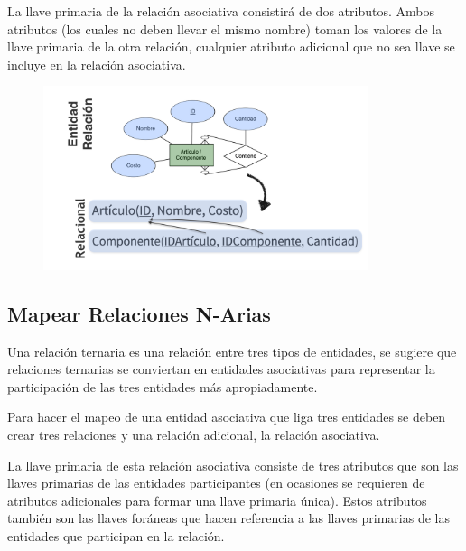 \documentclass[12pt, fleqn]{report}                             %
\theoremstyle{break}                                            %
\begin{document}
                La llave primaria de la relación asociativa consistirá de dos atributos.
                Ambos atributos (los cuales no deben llevar el mismo nombre) toman los valores de la llave
                primaria de la otra relación, cualquier atributo adicional que no sea llave se incluye en la
                relación asociativa.

                \begin{figure}[h]
                    \centering
                    \includegraphics[width=0.85\textwidth]{MapeoRelacionesUnariasMuchosMuchos}
                \end{figure}



            \clearpage
            \subsection{Mapear Relaciones N-Arias}

                Una relación ternaria es una relación entre tres tipos de entidades, se sugiere que
                relaciones ternarias se conviertan en entidades asociativas para representar la participación
                de las tres entidades más apropiadamente.


                Para hacer el mapeo de una entidad asociativa que liga tres entidades se deben crear tres
                relaciones y una relación adicional, la relación asociativa.

                La llave primaria de esta relación asociativa consiste de tres atributos que son las llaves
                primarias de las entidades participantes (en ocasiones se requieren de atributos adicionales
                para formar una llave primaria única). Estos atributos también son las llaves foráneas que hacen
                referencia a las llaves primarias de las entidades que participan en la relación.
\end{document}
